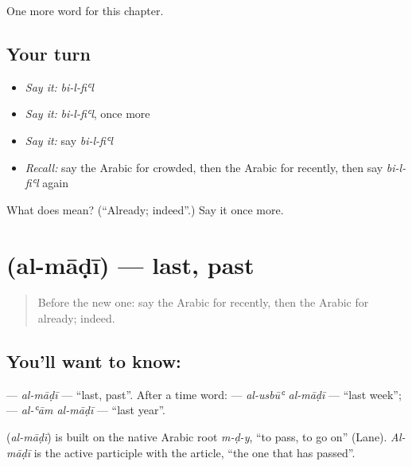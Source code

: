 \begin{grammarlens}[title={What you've built}]
One more word for this chapter.
\end{grammarlens}

\subsection*{Your turn}
\begin{itemize}
\raggedright
  \item \emph{Say it:} \emph{bi-l-fiʿl}
  \item \emph{Say it:} \emph{bi-l-fiʿl}, once more
  \item \emph{Say it:} say \emph{bi-l-fiʿl}
  \item \emph{Recall:} say the Arabic for crowded, then the Arabic for recently, then say \emph{bi-l-fiʿl} again
\end{itemize}

\begin{tcolorbox}[breakable,colback=teal!4,colframe=teal!35!black,title={Before you move on}]
What does  mean? (\textquotedblleft{}Already; indeed\textquotedblright{}.) Say it once more.
\end{tcolorbox}
\section[\texorpdfstring{\ar{الماضي} (al-māḍī)}{الماضي (al-māḍī)}]{ (al-māḍī) — last, past}

\label{lesson:AR-C156-al-madi}



\begin{quote}
Before the new one: say the Arabic for recently, then the Arabic for already; indeed.
\end{quote}

\subsection*{You'll want to know: }
\textbf{} — \emph{al-māḍī} — \textquotedblleft{}last, past\textquotedblright{}. After a time word: \textbf{ } — \emph{al-usbūʿ al-māḍī} — \textquotedblleft{}last week\textquotedblright{}; \textbf{ } — \emph{al-ʿām al-māḍī} — \textquotedblleft{}last year\textquotedblright{}.

\begin{cousinweb}
\textbf{} (\emph{al-māḍī}) is built on the native Arabic root \emph{m-ḍ-y}, \textquotedblleft{}to pass, to go on\textquotedblright{} (Lane). \emph{Al-māḍī} is the active participle with the article, \textquotedblleft{}the one that has passed\textquotedblright{}.
\end{cousinweb}

